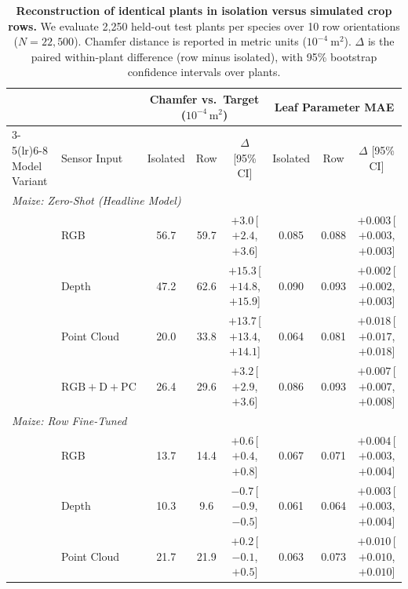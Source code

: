 \documentclass[10pt,twocolumn,letterpaper]{article}
\begin{document}
\begin{table}[t]
  \caption{\textbf{Reconstruction of identical plants in isolation versus simulated crop rows.} We evaluate 2{,}250 held-out test plants per species over 10 row orientations ($N = 22{,}500$). Chamfer distance is reported in metric units ($10^{-4}~\mathrm{m}^2$). $\Delta$ is the paired within-plant difference (row minus isolated), with 95\% bootstrap confidence intervals over plants.}
  \label{tab:rows}\label{tab:regime_3}
  \centering\scriptsize
  \setlength{\tabcolsep}{3.0pt}
  \begin{tabular}{l l ccc ccc}
    \toprule
    & & \multicolumn{3}{c}{Chamfer vs.\ Target ($10^{-4}\,\mathrm{m}^2$)} & \multicolumn{3}{c}{Leaf Parameter MAE} \\
    \cmidrule(lr){3-5}\cmidrule(lr){6-8}
    Model Variant & Sensor Input & Isolated & Row & $\Delta$ [95\% CI] & Isolated & Row & $\Delta$ [95\% CI] \\
    \midrule
    \multicolumn{8}{l}{\emph{Maize: Zero-Shot (Headline Model)}} \\
    & RGB & 56.7 & 59.7 & $+3.0$\,{\scriptsize[$+2.4$, $+3.6$]} & 0.085 & 0.088 & $+0.003$\,{\scriptsize[$+0.003$, $+0.003$]} \\
    & Depth & 47.2 & 62.6 & $+15.3$\,{\scriptsize[$+14.8$, $+15.9$]} & 0.090 & 0.093 & $+0.002$\,{\scriptsize[$+0.002$, $+0.003$]} \\
    & Point Cloud & 20.0 & 33.8 & $+13.7$\,{\scriptsize[$+13.4$, $+14.1$]} & 0.064 & 0.081 & $+0.018$\,{\scriptsize[$+0.017$, $+0.018$]} \\
    & $\mathrm{RGB}+\mathrm{D}+\mathrm{PC}$ & 26.4 & 29.6 & $+3.2$\,{\scriptsize[$+2.9$, $+3.6$]} & 0.086 & 0.093 & $+0.007$\,{\scriptsize[$+0.007$, $+0.008$]} \\
    \midrule
    \multicolumn{8}{l}{\emph{Maize: Row Fine-Tuned}} \\
    & RGB & 13.7 & 14.4 & $+0.6$\,{\scriptsize[$+0.4$, $+0.8$]} & 0.067 & 0.071 & $+0.004$\,{\scriptsize[$+0.003$, $+0.004$]} \\
    & Depth & 10.3 & 9.6 & $-0.7$\,{\scriptsize[$-0.9$, $-0.5$]} & 0.061 & 0.064 & $+0.003$\,{\scriptsize[$+0.003$, $+0.004$]} \\
    & Point Cloud & 21.7 & 21.9 & $+0.2$\,{\scriptsize[$-0.1$, $+0.5$]} & 0.063 & 0.073 & $+0.010$\,{\scriptsize[$+0.010$, $+0.010$]} \\

\end{tabular}
\end{table}
\end{document}
